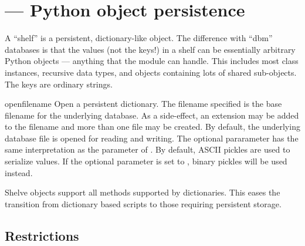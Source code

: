 \section{ ---
         Python object persistence}



A ``shelf'' is a persistent, dictionary-like object.  The difference
with ``dbm'' databases is that the values (not the keys!) in a shelf
can be essentially arbitrary Python objects --- anything that the
 module can handle.  This includes most class
instances, recursive data types, and objects containing lots of shared 
sub-objects.  The keys are ordinary strings.

\begin{funcdesc}{open}{filename}
Open a persistent dictionary.  The filename specified is the base filename
for the underlying database.  As a side-effect, an extension may be added to
the filename and more than one file may be created.  By default, the
underlying database file is opened for reading and writing.  The optional
{} pararameter has the same interpretation as the 
parameter of .  By default, ASCII pickles are used to
serialize values.  If the optional  parameter is set to
{}, binary pickles will be used instead.
\end{funcdesc}

Shelve objects support all methods supported by dictionaries.  This eases
the transition from dictionary based scripts to those requiring persistent
storage.

\subsection{Restrictions}

